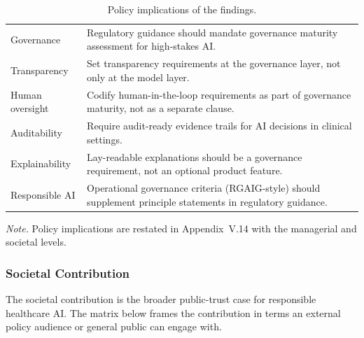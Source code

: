 {\tablestripes\tablefontsize
{}
\begin{xltabular}{\textwidth}{@{} >{\raggedright\arraybackslash}p{5cm} L @{}}
\caption[Policy implications of the findings]{Policy implications of the findings.}\label{tab:ch5_policy_implications} \\
\toprule
{} &  \\
\midrule
\endfirsthead
\endhead
\bottomrule
\endlastfoot
Governance & Regulatory guidance should mandate governance maturity assessment for high-stakes AI. \\
\addlinespace
Transparency & Set transparency requirements at the governance layer, not only at the model layer. \\
\addlinespace
Human oversight & Codify human-in-the-loop requirements as part of governance maturity, not as a separate clause. \\
\addlinespace
Auditability & Require audit-ready evidence trails for AI decisions in clinical settings. \\
\addlinespace
Explainability & Lay-readable explanations should be a governance requirement, not an optional product feature. \\
\addlinespace
Responsible AI & Operational governance criteria (RGAIG-style) should supplement principle statements in regulatory guidance. \\
\end{xltabular}}

\vspace{0.3em}\noindent\textit{Note.} Policy implications are restated in Appendix~V.14 with the managerial and societal levels.


\subsubsection{Societal Contribution}
\label{sec:ch5_societal_contribution}

\noindent The societal contribution is the broader public-trust case for responsible healthcare AI. The matrix below frames the contribution in terms an external policy audience or general public can engage with.

